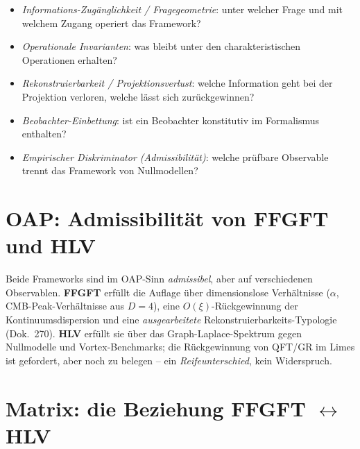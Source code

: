 \begin{itemize}
\item \emph{Informations-Zugänglichkeit / Fragegeometrie}: unter welcher Frage und mit welchem Zugang
operiert das Framework?
\item \emph{Operationale Invarianten}: was bleibt unter den charakteristischen Operationen erhalten?
\item \emph{Rekonstruierbarkeit / Projektionsverlust}: welche Information geht bei der Projektion verloren,
welche lässt sich zurückgewinnen?
\item \emph{Beobachter-Einbettung}: ist ein Beobachter konstitutiv im Formalismus enthalten?
\item \emph{Empirischer Diskriminator (Admissibilität)}: welche prüfbare Observable trennt das Framework
von Nullmodellen?
\end{itemize}

\section{OAP: Admissibilität von FFGFT und HLV}

Beide Frameworks sind im OAP-Sinn \emph{admissibel}, aber auf verschiedenen Observablen. \textbf{FFGFT}
erfüllt die Auflage über dimensionslose Verhältnisse ($\alpha$, CMB-Peak-Verhältnisse aus $D=4$), eine
$O(\xi)$-Rückgewinnung der Kontinuumsdispersion und eine \emph{ausgearbeitete}
Rekonstruierbarkeits-Typologie (Dok.~270). \textbf{HLV} erfüllt sie über das Graph-Laplace-Spektrum gegen
Nullmodelle und Vortex-Benchmarks; die Rückgewinnung von QFT/GR im Limes ist gefordert, aber noch zu
belegen -- ein \emph{Reifeunterschied}, kein Widerspruch.

\section{Matrix: die Beziehung FFGFT $\leftrightarrow$ HLV}

